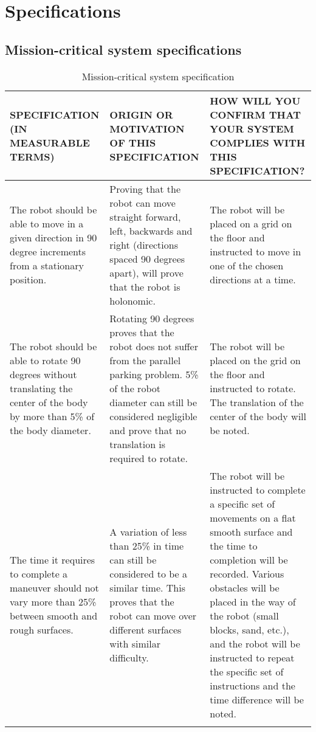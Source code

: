 
\section{Specifications}

\subsection{Mission-critical system specifications}

\begin{center}
\begin{longtable}{|p{5cm}|p{5cm}|p{5cm}|}
\hline
  \textbf{SPECIFICATION (IN MEASURABLE TERMS)} &
  \textbf{ORIGIN OR MOTIVATION OF THIS SPECIFICATION} &
  \textbf{HOW WILL YOU CONFIRM THAT YOUR SYSTEM COMPLIES WITH
           THIS SPECIFICATION?}\\
\hline The robot should be able to move in a given direction in 90 degree increments from a stationary position.
   & Proving that the robot can move straight forward, left, backwards and right (directions spaced 90 degrees apart), will prove that the robot is holonomic.
   &The robot will be placed on a grid on the floor and instructed to move in one of the chosen directions at a time.
   \\
\hline The robot should be able to rotate 90 degrees without translating the center of the body by more than 5\% of the body diameter.
   & Rotating 90 degrees proves that the robot does not suffer from the parallel parking problem. 5\% of the robot diameter can still be considered negligible and prove that no translation is required to rotate.
   & The robot will be placed on the grid on the floor and instructed to rotate. The translation of the center of the body will be noted.
   \\
\hline The time it requires to complete a maneuver should not vary more than 25\% between smooth and rough surfaces.
   & A variation of less than 25\% in time can still be considered to be a similar time. This proves that the robot can move over different surfaces with similar difficulty.
   &The robot will be instructed to complete a specific set of movements on a flat smooth surface and the time to completion will be recorded. Various obstacles will be placed in the way of the robot (small blocks, sand, etc.), and the robot will be instructed to repeat the specific set of instructions and the time difference will be noted.
   \\
\hline
\caption{Mission-critical system specification}
\end{longtable}
\end{center}

